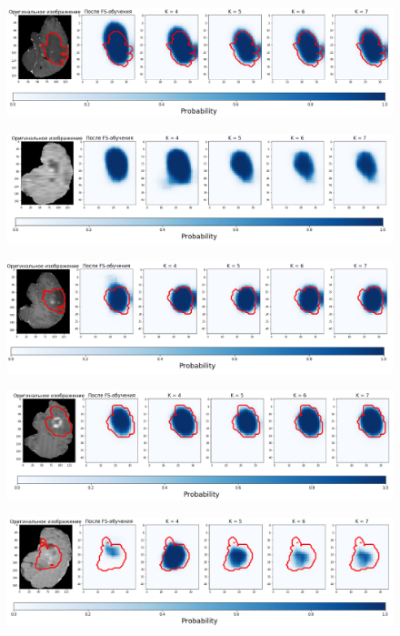 \begin{figure}[h!] 
  \center
  \includegraphics [scale=0.7] {images/good_2.png}
\end{figure}

\begin{figure}[h!] 
  \center
  \includegraphics [scale=0.7] {images/good_3.png}
\end{figure}

\begin{figure}[h!] 
  \center
  \includegraphics [scale=0.7] {images/good_4.png}
\end{figure}


\begin{figure}[h!] 
  \center
  \includegraphics [scale=0.7] {images/good_5.png}
\end{figure}


\begin{figure}[h!] 
  \center
  \includegraphics [scale=0.7] {images/good_6.png}
\end{figure}

